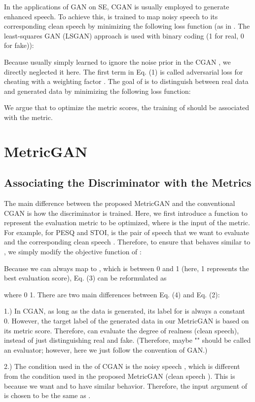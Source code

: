 \documentclass{article}
\begin{document}
In the applications of GAN on SE, CGAN is usually employed to generate enhanced speech. To achieve this,  is trained to map noisy speech  to its corresponding clean speech  by minimizing the following loss function (as in \cite{pascual2017segan}. The least-squares GAN (LSGAN) approach \cite{mao2017least} is used with binary coding (1 for real, 0 for fake)):


Because  usually simply learned to ignore the noise prior  in the CGAN \cite{isola2017image}, we directly neglected it here. The first term in Eq. (1) is called adversarial loss for cheating  with a weighting factor . The goal of  is to distinguish between real data and generated data by minimizing the following loss function:


We argue that to optimize the metric scores, the training of  should be associated with the metric.  

\section{MetricGAN}
\subsection{Associating the Discriminator with the Metrics}
The main difference between the proposed MetricGAN and the conventional CGAN is how the discriminator is trained. Here, we first introduce a function  to represent the evaluation metric to be optimized, where  is the input of the metric. For example, for PESQ and STOI,  is the pair of speech that we want to evaluate and the corresponding clean speech . Therefore, to ensure that  behaves similar to , we simply modify the objective function of :


Because we can always map  to , which is between 0 and 1 (here, 1 represents the best evaluation score), Eq. (3) can be reformulated as


where 0    1. There are two main differences between Eq. (4) and Eq. (2): 

1.) In CGAN, as long as the data is generated, its label for  is always a constant 0. However, the target label of the generated data in our MetricGAN is based on its metric score. Therefore,  can evaluate the degree of realness (clean speech), instead of just distinguishing real and fake. (Therefore, maybe "" should be called an evaluator; however, here we just follow the convention of GAN.)

2.) The condition used in the  of CGAN is the noisy speech , which is different from the condition used in the proposed MetricGAN (clean speech ). This is because we want  and  to have similar behavior. Therefore, the input argument of  is chosen to be the same as .
\end{document}
